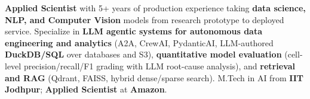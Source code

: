 \documentclass[letter,10pt]{article}
\begin{document}

\textbf{Applied Scientist} with 5+ years of production experience taking \textbf{data science, NLP, and Computer Vision} models from research prototype to deployed service.
Specialize in \textbf{LLM agentic systems for autonomous data engineering and analytics} (A2A, CrewAI, PydanticAI, LLM-authored \textbf{DuckDB/SQL} over databases and S3), \textbf{quantitative model evaluation} (cell-level precision/recall/F1 grading with LLM root-cause analysis), and \textbf{retrieval and RAG} (Qdrant, FAISS, hybrid dense/sparse search).
M.Tech in AI from \textbf{IIT Jodhpur}; \textbf{Applied Scientist} at \textbf{Amazon}.
\end{document}
